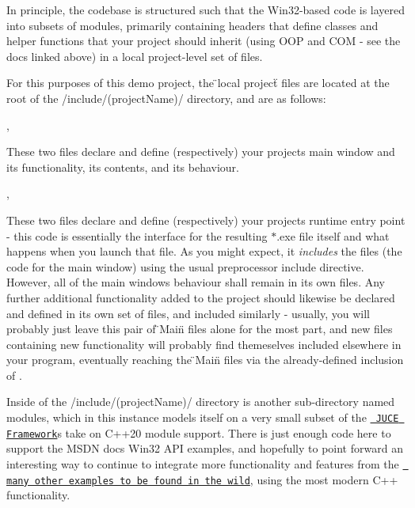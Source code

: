 In principle, the codebase is structured such that the Win32-\/based code is layered into subsets of modules, primarily containing headers that define classes and helper functions that your project should inherit (using OOP and COM -\/ see the docs linked above) in a local project-\/level set of files.

For this purposes of this demo project, the \"{}local project\"{} files are located at the root of the \textquotesingle{}/include/(project\+Name)/\textquotesingle{} directory, and are as follows\+:


\begin{DoxyItemize}
\item {}, 

These two files declare and define (respectively) your project\textquotesingle{}s \textquotesingle{}main window\textquotesingle{} and it\textquotesingle{}s functionality, it\textquotesingle{}s contents, and it\textquotesingle{}s behaviour.
\item {}, 

These two files declare and define (respectively) your project\textquotesingle{}s \textquotesingle{}runtime entry point\textquotesingle{} -\/ this code is essentially the interface for the resulting \textquotesingle{}\texorpdfstring{$\ast$}{*}.exe\textquotesingle{} file itself and what happens when you launch that file. As you might expect, it {\itshape includes} the \textquotesingle{}\textquotesingle{} files (the code for the main window) using the usual preprocessor include directive. However, all of the main window\textquotesingle{}s behaviour shall remain in it\textquotesingle{}s own files. Any further additional functionality added to the project should likewise be declared and defined in it\textquotesingle{}s own set of files, and included similarly -\/ usually, you will probably just leave this pair of \"{}\+Main\"{} files alone for the most part, and new files containing new functionality will probably find themeselves included elsewhere in your program, eventually reaching the \"{}\+Main\"{} files via the already-\/defined inclusion of \textquotesingle{}\textquotesingle{}.
\end{DoxyItemize}

Inside of the \textquotesingle{}/include/(project\+Name)/\textquotesingle{} directory is another sub-\/directory named \textquotesingle{}modules\textquotesingle{}, which in this instance models itself on a very small subset of the \href{https://github.com/juce-framework/JUCE.git}{\texttt{ JUCE Framework}}\textquotesingle{}s take on C++20 module support. There is just enough code here to support the MSDN docs Win32 API examples, and hopefully to point forward an interesting way to continue to integrate more functionality and features from the \href{https://github.com/microsoft/Windows-classic-samples.git}{\texttt{ many other examples to be found in the wild}}, using the most modern C++ functionality.

